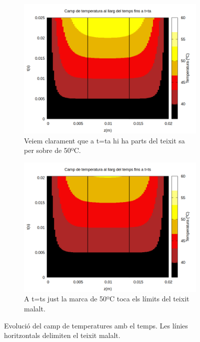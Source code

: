 \documentclass[11pt]{article}
\begin{document}
\begin{figure}[hbt!]
    \centering
    \begin{subfigure}{0.4\textwidth}
        \centering
        \includegraphics[width=\textwidth]{camp_ta.png}
        \caption{Veiem clarament que a t=ta hi ha parts del teixit sa per sobre de 50ºC.}
    \end{subfigure}
    \hspace{0.01\textwidth}
    \begin{subfigure}{0.4\textwidth}
        \centering
        \includegraphics[width=\textwidth]{camp_ts.png}
        \caption{A t=ts just la marca de 50ºC toca els límits del teixit malalt.}
    \end{subfigure}


    \caption{Evolució del camp de temperatures amb el temps. Les línies horitzontals delimiten el teixit malalt.}
    \label{fig:dues_imatges}
\end{figure}
\end{document}

